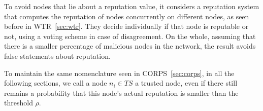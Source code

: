 To avoid nodes that lie about a reputation value, it considers a reputation
system that computes the reputation of nodes concurrently on different nodes,
as seen before in WTR~\ref{sec:wtr}.
They decide individually if that node is reputable or not, using a voting
scheme in case of disagreement. On the whole, assuming that there is a smaller
percentage of malicious nodes in the network, the result avoids
false statements about reputation.

To maintain the same nomenclature seen in CORPS~\ref{sec:corps}, in all the following sections,
we call a node $n_i \in TS$ a trusted node, even if there still remains a
probability that this node's actual reputation is smaller than the threshold
$\rho$.
